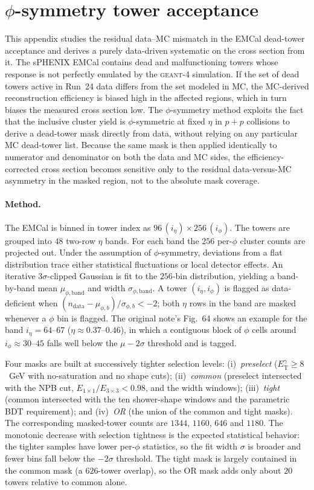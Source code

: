 \documentclass[11pt]{article}
\newcommand{\ETg}{E_{\mathrm{T}}^{\gamma}}
\begin{document}
\section{$\phi$-symmetry tower acceptance}
\label{app:phisym}
This appendix studies the residual data--MC mismatch in the EMCal dead-tower
acceptance and derives a purely data-driven systematic on the cross section from
it. The sPHENIX EMCal contains dead and malfunctioning towers whose response is
not perfectly emulated by the \textsc{geant-4} simulation. If the set of dead
towers active in Run~24 data differs from the set modeled in MC, the
MC-derived reconstruction efficiency is biased high in the affected regions,
which in turn biases the measured cross section low. The $\phi$-symmetry method
exploits the fact that the inclusive cluster yield is $\phi$-symmetric at fixed
$\eta$ in $p+p$ collisions to derive a dead-tower mask directly from data,
without relying on any particular MC dead-tower list. Because the same mask is
then applied identically to numerator and denominator on both the data and MC
sides, the efficiency-corrected cross section becomes sensitive only to the
residual data-versus-MC asymmetry in the masked region, not to the absolute mask
coverage.

\paragraph{Method.} The EMCal is binned in tower index as
$96\,(i_\eta)\times256\,(i_\phi)$. The towers are grouped into $48$ two-row
$\eta$ bands. For each band the $256$ per-$\phi$ cluster counts are projected out.
Under the assumption of $\phi$-symmetry, deviations from a flat distribution
trace either statistical fluctuations or local detector effects. An iterative
$3\sigma$-clipped Gaussian is fit to the $256$-bin distribution, yielding a
band-by-band mean $\mu_{\phi,\mathrm{band}}$ and width $\sigma_{\phi,\mathrm{band}}$.
A tower $(i_\eta,i_\phi)$ is flagged as data-deficient when
$(n_{\mathrm{data}}-\mu_{\phi,b})/\sigma_{\phi,b} < -2$; both $\eta$ rows in the
band are masked whenever a $\phi$ bin is flagged. The original note's Fig.~64
shows an example for the band $i_\eta=64$--$67$ ($\eta\approx0.37$--$0.46$), in
which a contiguous block of $\phi$ cells around $i_\phi\approx30$--$45$ falls well
below the $\mu-2\sigma$ threshold and is tagged.

Four masks are built at successively tighter selection levels: (i)~\emph{preselect}
($\ETg\ge8$~GeV with no-saturation and no shape cuts); (ii)~\emph{common}
(preselect intersected with the NPB cut, $E_{1\times1}/E_{3\times3}<0.98$, and the
width windows); (iii)~\emph{tight} (common intersected with the ten shower-shape
windows and the parametric BDT requirement); and (iv)~\emph{OR} (the union of the
common and tight masks). The corresponding masked-tower counts are $1344$, $1160$,
$646$ and $1180$. The monotonic decrease with selection tightness is the expected
statistical behavior: the tighter samples have lower per-$\phi$ statistics, so the
fit width $\sigma$ is broader and fewer bins fall below the $-2\sigma$ threshold.
The tight mask is largely contained in the common mask (a $626$-tower overlap), so
the OR mask adds only about $20$ towers relative to common alone.
\end{document}
